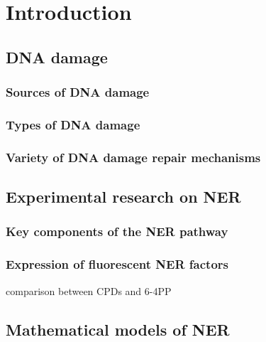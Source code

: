 \chapter{Introduction}
\pagestyle{plain}
%
%
\section{DNA damage}

\subsection{Sources of DNA damage}

\subsection{Types of DNA damage}

\subsection{Variety of DNA damage repair mechanisms}

\section{Experimental research on NER}
\label{sec:NERexperiments}
\subsection{Key components of the NER pathway}
\subsection{Expression of fluorescent NER factors}
comparison between CPDs and 6-4PP
\section{Mathematical models of NER}